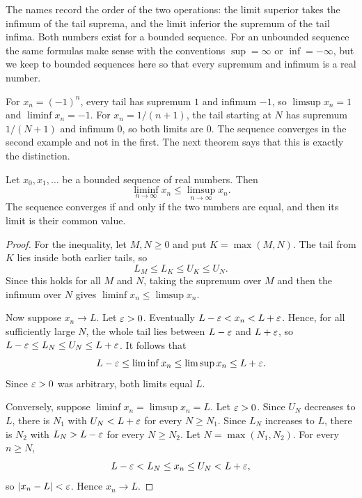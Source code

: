 The names record the order of the two operations: the limit superior takes the infimum of the tail suprema, and the limit inferior the supremum of the tail infima. Both numbers exist for a bounded sequence. For an unbounded sequence the same formulas make sense with the conventions $\sup=\infty$ or $\inf=-\infty$, but we keep to bounded sequences here so that every supremum and infimum is a real number.

For $x_n=(-1)^n$, every tail has supremum $1$ and infimum $-1$, so $\limsup x_n=1$ and $\liminf x_n=-1$. For $x_n=1/(n+1)$, the tail starting at $N$ has supremum $1/(N+1)$ and infimum $0$, so both limits are $0$. The sequence converges in the second example and not in the first. The next theorem says that this is exactly the distinction.

\par\noindent\begin{minipage}{\linewidth}
\begin{theorem}\label{ch11:thm:limsup}
Let $x_0,x_1,\ldots$ be a bounded sequence of real numbers. Then
\[
\liminf_{n\to\infty}x_n\le\limsup_{n\to\infty}x_n.
\]
The sequence converges if and only if the two numbers are equal, and then its limit is their common value.
\end{theorem}
\end{minipage}\par

\begin{proof}
For the inequality, let $M,N\ge0$ and put $K=\max(M,N)$. The tail from $K$ lies inside both earlier tails, so
\[
L_M\le L_K\le U_K\le U_N.
\]
Since this holds for all $M$ and $N$, taking the supremum over $M$ and then the infimum over $N$ gives $\liminf x_n\le\limsup x_n$.

Now suppose $x_n\to L$. Let $\varepsilon>0$. Eventually $L-\varepsilon<x_n<L+\varepsilon$. Hence, for all sufficiently large $N$, the whole tail lies between $L-\varepsilon$ and $L+\varepsilon$, so $L-\varepsilon\le L_N\le U_N\le L+\varepsilon$. It follows that
\[
L-\varepsilon\le\liminf x_n\le\limsup x_n\le L+\varepsilon.
\]
Since $\varepsilon>0$ was arbitrary, both limits equal $L$.

Conversely, suppose $\liminf x_n=\limsup x_n=L$. Let $\varepsilon>0$. Since $U_N$ decreases to $L$, there is $N_1$ with $U_N<L+\varepsilon$ for every $N\ge N_1$. Since $L_N$ increases to $L$, there is $N_2$ with $L_N>L-\varepsilon$ for every $N\ge N_2$. Let $N=\max(N_1,N_2)$. For every $n\ge N$,
\[
L-\varepsilon<L_N\le x_n\le U_N<L+\varepsilon,
\]
so $|x_n-L|<\varepsilon$. Hence $x_n\to L$.
\end{proof}
